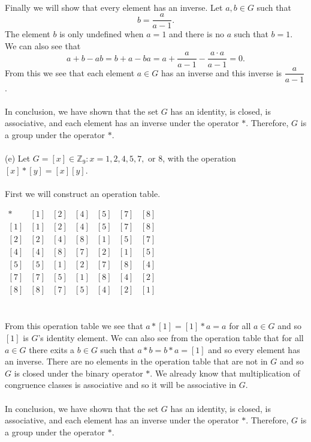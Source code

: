 \documentclass[11pt,a4paper]{article}
\begin{document}
~\\
Finally we will show that every element has an inverse. Let $a,b \in G$ such that
\[b = \dfrac{a}{a-1}.\] The element $b$ is only undefined when $a = 1$ and there is no $a$ such that $b=1$. We can also see that \[a+b-ab = b+a-ba = a + \dfrac{a}{a-1} - \dfrac{a\cdot a}{a-1} = 0.\]
From this we see that each element $a\in G$ has an inverse and this inverse is $\dfrac{a}{a-1}$.\\
~\\
In conclusion, we have shown that the set $G$ has an identity, is closed, is associative, and each element has an inverse under the operator $*$. Therefore, $G$ is a group under the operator $*$.\\
~\\
(e) Let $G = {[x] \in \mathbb{Z}_9 : x = 1, 2, 4, 5, 7, \text{ or } 8}$, with the operation $[x] *
[y] = [x][y]$.\\
~\\
First we will construct an operation table.
\begin{center}
$
\begin{array}{c|c|c|c|c|c|c}
* & [1] & [2] & [4] & [5] & [7] & [8]\\\hline
[1] & [1] & [2] & [4] & [5] & [7] & [8]\\\hline
[2] & [2] & [4] & [8] & [1] & [5] & [7]\\\hline
[4] & [4] & [8] & [7] & [2] & [1] & [5]\\\hline
[5] & [5] & [1] & [2] & [7] & [8] & [4]\\\hline
[7] & [7] & [5] & [1] & [8] & [4] & [2]\\\hline
[8] & [8] & [7] & [5] & [4] & [2] & [1]\\
\end{array}
$
\end{center}
~\\
From this operation table we see that $a*[1] = [1]*a = a$ for all $a\in G$ and so $[1]$ is $G$'s identity element. We can also see from the operation table that for all $a \in G$ there exits a $b\in G$ such that $a*b = b*a = [1]$ and so every element has an inverse. There are no elements in the operation table that are not in $G$ and so $G$ is closed under the binary operator $*$. We already know that multiplication of congruence classes is associative and so it will be associative in $G$.\\
~\\
In conclusion, we have shown that the set $G$ has an identity, is closed, is associative, and each element has an inverse under the operator $*$. Therefore, $G$ is a group under the operator $*$.\\
\end{document}
